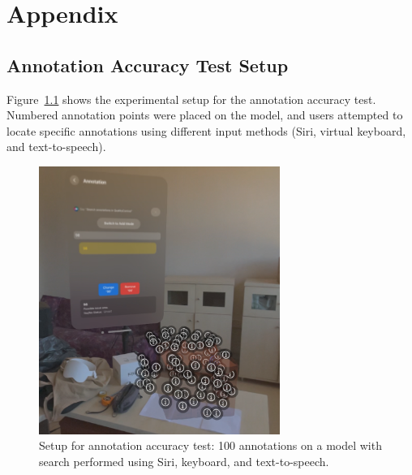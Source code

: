 \appendix
\chapter{Appendix}

\section{Annotation Accuracy Test Setup}
Figure~\ref{fig:annot_test_setup} shows the experimental setup for the annotation accuracy test. Numbered annotation points were placed on the model, and users attempted to locate specific annotations using different input methods (Siri, virtual keyboard, and text-to-speech).

\begin{figure}[h!]
    \centering
    \includegraphics[width=0.7\textwidth]{../Imgs/100_annotations.png}
    \caption{Setup for annotation accuracy test: 100 annotations on a model with search performed using Siri, keyboard, and text-to-speech.}
    \label{fig:annot_test_setup}
\end{figure}
